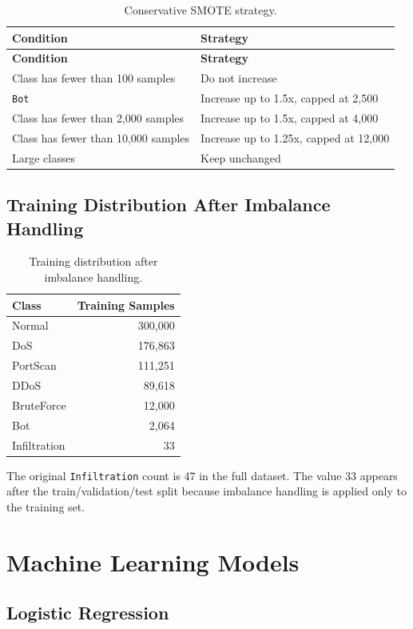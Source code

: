 \documentclass[12pt,a4paper]{article}
\begin{document}
\begin{longtable}{p{} p{}}
\caption{Conservative SMOTE strategy.}\\
\toprule
\textbf{Condition} & \textbf{Strategy} \\
\midrule
\endfirsthead
\toprule
\textbf{Condition} & \textbf{Strategy} \\
\midrule
\endhead
Class has fewer than 100 samples & Do not increase \\
\texttt{Bot} & Increase up to 1.5x, capped at 2,500 \\
Class has fewer than 2,000 samples & Increase up to 1.5x, capped at 4,000 \\
Class has fewer than 10,000 samples & Increase up to 1.25x, capped at 12,000 \\
Large classes & Keep unchanged \\
\bottomrule
\end{longtable}

\subsection{Training Distribution After Imbalance Handling}

\begin{longtable}{l r}
\caption{Training distribution after imbalance handling.}\\
\toprule
\textbf{Class} & \textbf{Training Samples} \\
\midrule
Normal & 300,000 \\
DoS & 176,863 \\
PortScan & 111,251 \\
DDoS & 89,618 \\
BruteForce & 12,000 \\
Bot & 2,064 \\
Infiltration & 33 \\
\bottomrule
\end{longtable}

The original \texttt{Infiltration} count is 47 in the full dataset. The value 33 appears after the train/validation/test split because imbalance handling is applied only to the training set.

\section{Machine Learning Models}

\subsection{Logistic Regression}
\end{document}
